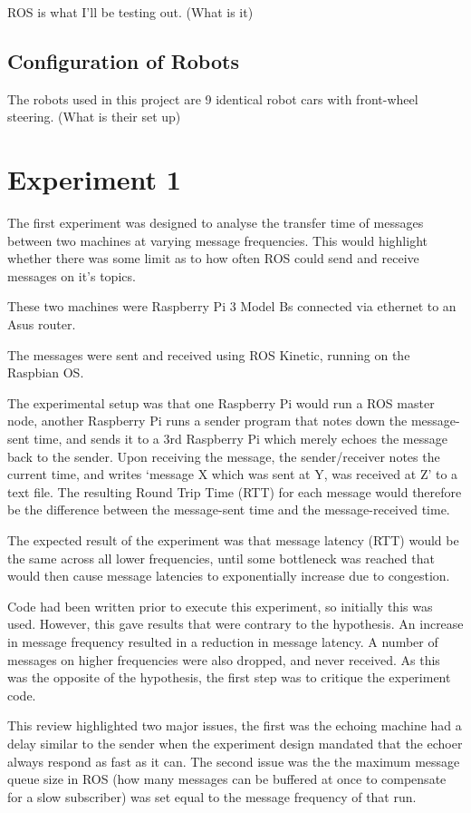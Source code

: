 \documentclass{l4proj}
\begin{document}
ROS is what I'll be testing out. (What is it)

\section{Configuration of Robots}

The robots used in this project are 9 identical robot cars with front-wheel steering. (What is their set up)


\chapter{Experiment 1}

The first experiment was designed to analyse the transfer time of messages between two machines at varying message frequencies. This would highlight whether there was some limit as to how often ROS could send and receive messages on it's topics.

These two machines were Raspberry Pi 3 Model Bs connected via ethernet to an Asus router.

The messages were sent and received using ROS Kinetic, running on the Raspbian OS.

The experimental setup was that one Raspberry Pi would run a ROS master node, another Raspberry Pi runs a sender program that notes down the message-sent time, and sends it to a 3rd Raspberry Pi which merely echoes the message back to the sender. Upon receiving the message, the sender/receiver notes the current time, and writes `message X which was sent at Y, was received at Z' to a text file. The resulting Round Trip Time (RTT) for each message would therefore be the difference between the message-sent time and the message-received time.

The expected result of the experiment was that message latency (RTT) would be the same across all lower frequencies, until some bottleneck was reached that would then cause message latencies to exponentially increase due to congestion.

Code had been written prior to execute this experiment, so initially this was used\cite{Experiment1InitialCode}. However, this gave results that were contrary to the hypothesis. An increase in message frequency resulted in a reduction in message latency. A number of messages on higher frequencies were also dropped, and never received. As this was the opposite of the hypothesis, the first step was to critique the experiment code.

This review highlighted two major issues, the first was the echoing machine had a delay similar to the sender when the experiment design mandated that the echoer always respond as fast as it can. The second issue was the the maximum message queue size in ROS (how many messages can be buffered at once to compensate for a slow subscriber) was set equal to the message frequency of that run.
\end{document}
